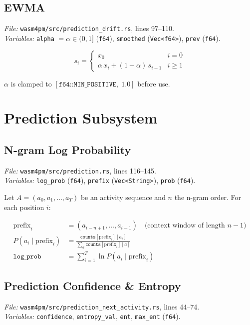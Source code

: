 \documentclass[11pt,a4paper]{article}
\begin{document}
\subsection{EWMA}
\textit{File:} \texttt{wasm4pm/src/prediction\_drift.rs}, lines 97--110.\\
\textit{Variables:} \texttt{alpha} $=\alpha\in(0,1]$ (\texttt{f64}), \texttt{smoothed} (\texttt{Vec<f64>}), \texttt{prev} (\texttt{f64}).

\begin{equation}
  s_i =
  \begin{cases}
    x_0 & i = 0 \\
    \alpha\, x_i + (1-\alpha)\, s_{i-1} & i \geq 1
  \end{cases}
\end{equation}

$\alpha$ is clamped to $[\texttt{f64::MIN\_POSITIVE},\; 1.0]$ before use.

\section{Prediction Subsystem}

\subsection{N-gram Log Probability}
\textit{File:} \texttt{wasm4pm/src/prediction.rs}, lines 116--145.\\
\textit{Variables:} \texttt{log\_prob} (\texttt{f64}), \texttt{prefix} (\texttt{Vec<String>}), \texttt{prob} (\texttt{f64}).

Let $A = (a_0, a_1, \ldots, a_T)$ be an activity sequence and $n$ the n-gram order. For each position $i$:

\begin{align}
  \text{prefix}_i &= (a_{i-n+1},\ldots,a_{i-1}) \quad\text{(context window of length }n-1) \\[4pt]
  P(a_i \mid \text{prefix}_i) &= \frac{\texttt{counts}[\text{prefix}_i][a_i]}
                                      {\sum_{a}\texttt{counts}[\text{prefix}_i][a]} \\[6pt]
  \texttt{log\_prob} &= \sum_{i=1}^{T} \ln P(a_i \mid \text{prefix}_i)
\end{align}

\subsection{Prediction Confidence \& Entropy}
\textit{File:} \texttt{wasm4pm/src/prediction\_next\_activity.rs}, lines 44--74.\\
\textit{Variables:} \texttt{confidence}, \texttt{entropy\_val}, \texttt{ent}, \texttt{max\_ent} (\texttt{f64}).
\end{document}
